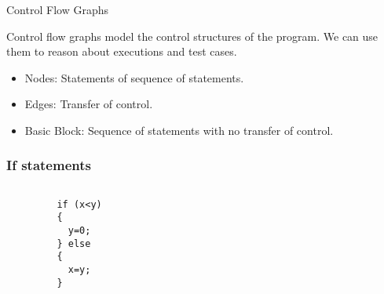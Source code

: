 \documentclass[handout]{beamer}
\begin{document}
 \begin{frame}{Control Flow Graphs}

Control flow graphs model the control structures of the program. We
can use them to reason about executions and test cases.
\begin{itemize}
\item Nodes: Statements of sequence of statements.
\item Edges: Transfer of control.
\item Basic Block: Sequence of statements with no transfer of control.
\end{itemize}
\end{frame}


\begin{frame}[fragile]%
\frametitle{If statements}
\begin{columns}
\begin{column}{0.5\textwidth}
\begin{lstlisting}
         if (x<y) 
         { 
           y=0; 
         } else
         {
           x=y;
         }
\end{lstlisting}
\end{column}
\begin{column}{0.5\textwidth}
\end{column}
\end{columns}
\end{frame}
\end{document}
